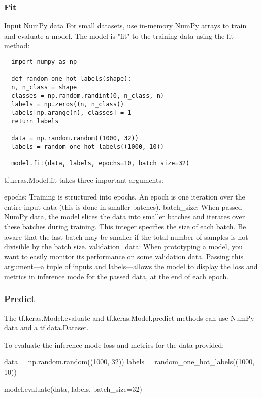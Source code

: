 \subsubsection{Fit}
Input NumPy data
For small datasets, use in-memory NumPy arrays to train and evaluate a model. The model is "fit" to the training data using the fit method:

\begin{verbatim}
  import numpy as np

  def random_one_hot_labels(shape):
  n, n_class = shape
  classes = np.random.randint(0, n_class, n)
  labels = np.zeros((n, n_class))
  labels[np.arange(n), classes] = 1
  return labels

  data = np.random.random((1000, 32))
  labels = random_one_hot_labels((1000, 10))

  model.fit(data, labels, epochs=10, batch_size=32)

\end{verbatim}

tf.keras.Model.fit takes three important arguments:

epochs: Training is structured into epochs. An epoch is one iteration over the entire input data (this is done in smaller batches).
batch_size: When passed NumPy data, the model slices the data into smaller batches and iterates over these batches during training. This integer specifies the size of each batch. Be aware that the last batch may be smaller if the total number of samples is not divisible by the batch size.
validation_data: When prototyping a model, you want to easily monitor its performance on some validation data. Passing this argument—a tuple of inputs and labels—allows the model to display the loss and metrics in inference mode for the passed data, at the end of each epoch.

\subsubsection{Predict}
The tf.keras.Model.evaluate and tf.keras.Model.predict methods can use NumPy data and a tf.data.Dataset.

To evaluate the inference-mode loss and metrics for the data provided:

data = np.random.random((1000, 32))
labels = random_one_hot_labels((1000, 10))

model.evaluate(data, labels, batch_size=32)

